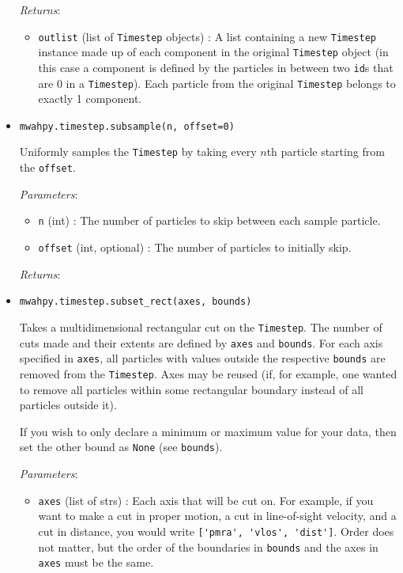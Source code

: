 \documentclass{article}
\begin{document}
\begin{itemize}
\textit{Returns}:  \begin{itemize}

\item \verb!outlist! (list of \verb!Timestep! objects) : A list containing a new \verb!Timestep! instance made up of each component in the original \verb!Timestep! object (in this case a component is defined by the particles in between two \verb!id!s that are 0 in a \verb!Timestep!). Each particle from the original \verb!Timestep! belongs to exactly 1 component.

\end{itemize}



\item \verb!mwahpy.timestep.subsample(n, offset=0)!

Uniformly samples the \verb!Timestep! by taking every $n$th particle starting from the \verb!offset!.

\textit{Parameters}: \begin{itemize}

\item \verb!n! (int) : The number of particles to skip between each sample particle.

\item \verb!offset! (int, optional) : The number of particles to initially skip.

\end{itemize}

\textit{Returns}: 



\item \verb!mwahpy.timestep.subset_rect(axes, bounds)!

Takes a multidimensional rectangular cut on the \verb!Timestep!. The number of cuts made and their extents are defined by \verb!axes! and \verb!bounds!. For each axis specified in \verb!axes!, all particles with values outside the respective \verb!bounds! are removed from the \verb!Timestep!. Axes may be reused (if, for example, one wanted to remove all particles within some rectangular boundary instead of all particles outside it).

If you wish to only declare a minimum or maximum value for your data, then set the other bound as \verb!None! (see \verb!bounds!).

\textit{Parameters}: \begin{itemize}

\item \verb!axes! (list of strs) : Each axis that will be cut on. For example, if you want to make a cut in proper motion, a cut in line-of-sight velocity, and a cut in distance, you would write \verb!['pmra', 'vlos', 'dist']!. Order does not matter, but the order of the boundaries in \verb!bounds! and the axes in \verb!axes! must be the same.


\end{itemize}
\end{itemize}
\end{document}
